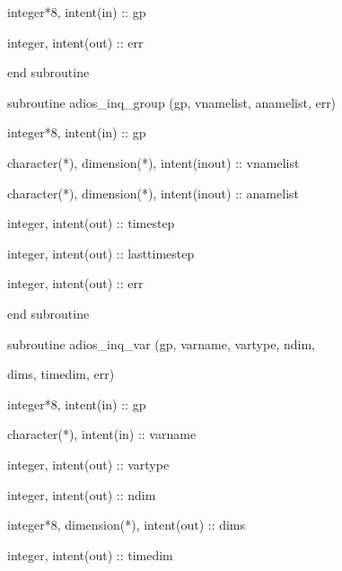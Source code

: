 \vspace{10pt}
\parindent=36pt
integer*8,      intent(in)  :: gp

\vspace{10pt}
integer,        intent(out) :: err

\vspace{10pt}
\parindent=0pt
end subroutine

\vspace{22pt}
subroutine adios\_inq\_group (gp, vnamelist, anamelist, err)

\vspace{10pt}
\parindent=36pt
integer*8,      intent(in)  :: gp

\vspace{10pt}
character(*), dimension(*), intent(inout) :: vnamelist

\vspace{10pt}
character(*), dimension(*), intent(inout) :: anamelist

\vspace{10pt}
integer,        intent(out) :: timestep

\vspace{10pt}
integer,        intent(out) :: lasttimestep

\vspace{10pt}
integer,        intent(out) :: err

\vspace{10pt}
\parindent=0pt
end subroutine

\vspace{22pt}
subroutine adios\_inq\_var (gp, varname, vartype, ndim, 

\vspace{10pt}
\parindent=93pt
dims, timedim, err)

\vspace{10pt}
\parindent=36pt
integer*8,      intent(in)  :: gp

\vspace{10pt}
character(*),   intent(in)  :: varname

\vspace{10pt}
integer,        intent(out) :: vartype

\vspace{10pt}
integer,        intent(out) :: ndim

\vspace{10pt}
integer*8, dimension(*), intent(out) :: dims

\vspace{10pt}
integer,        intent(out) :: timedim

